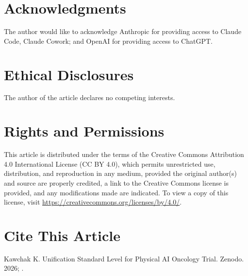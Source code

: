 \documentclass[11pt,a4paper]{article}
\begin{document}
\section*{Acknowledgments}
The author would like to acknowledge Anthropic for providing access to Claude Code, Claude Cowork; and OpenAI for providing access to ChatGPT.

\section*{Ethical Disclosures}
The author of the article declares no competing interests.

\section*{Rights and Permissions}
This article is distributed under the terms of the Creative Commons Attribution 4.0 International License (CC BY 4.0), which permits unrestricted use, distribution, and reproduction in any medium, provided the original author(s) and source are properly credited, a link to the Creative Commons license is provided, and any modifications made are indicated. To view a copy of this license, visit \url{https://creativecommons.org/licenses/by/4.0/}.

\section*{Cite This Article}
Kawchak K. Unification Standard Level for Physical AI Oncology Trial. Zenodo. 2026; .
\end{document}
